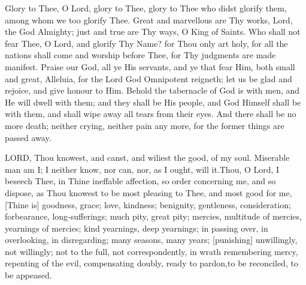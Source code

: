 Glory to Thee, O Lord, glory to Thee, glory to Thee who didst glorify them, among whom we too glorify Thee.  Great and marvellous are Thy works, Lord, the God Almighty; just and true are Thy ways, O King of Saints. Who shall not fear Thee, O Lord, and glorify Thy Name? for Thou only art holy, for all the nations shall come and worship before Thee, for Thy judgments are made manifest. Praise our God, all ye His servants, and ye that fear Him, both small and great, Alleluia, for the Lord God Omnipotent reigneth; let us be glad and rejoice, and give honour to Him. Behold the tabernacle of God is with men, and He will dwell with them; and they shall be His people, and God Himself shall be with them, and shall wipe away all tears from their eyes. And there shall be no more death; neither crying, neither pain any more, for the former things are passed away.



LORD, Thou knowest, and canst, and wiliest the good, of my soul. Miserable man am I; I neither know, nor can, nor, as I ought, will it.Thou, O Lord, I beseech Thee, in Thine ineffable affection, so order concerning me, and so dispose, as Thou knowest to be most pleasing to Thee, and most good for me,  [Thine is] goodness, grace; love, kindness; benignity, gentleness, consideration; forbearance, long‑sufferings; much pity, great pity; mercies, multitude of mercies, yearnings of mercies; kind yearnings, deep yearnings; in passing over, in overlooking, in disregarding; many seasons, many years; [punishing] unwillingly, not willingly; not to the full, not correspondently, in wrath remembering mercy, repenting of the evil, compensating doubly, ready to pardon,to be reconciled, to be appeased.


